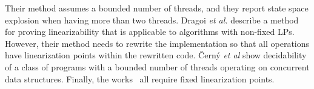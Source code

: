 Their method assumes a bounded number of threads, and
they report state space explosion when having more than two threads.
%
Dragoi  {\it et al.} \cite{Henzinger:CAV13} describe a method for proving
linearizability that is applicable to algorithms with non-fixed LPs.
%
However, their method needs to rewrite the implementation so that all operations 
have linearization points within the rewritten code.
%
\v{C}ern{\'y} {\it et al} \cite{CernyRZCA:CAV10} show decidability of a class
of programs with a bounded number of threads operating on concurrent data structures.
%
%
Finally, the works~\cite{AHHR:integrated,BLMRS:cav08,Vafeiadis:vmcai09}
all require fixed linearization points.

